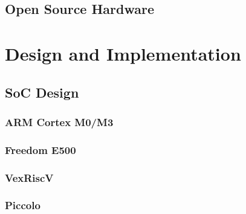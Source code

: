 \documentclass[a4paper,9pt]{report}
\begin{document}
\section{Open Source Hardware}

\section{}



\chapter{Design and Implementation}





%




\section{SoC Design}
\subsection{ARM Cortex M0/M3}
\subsection{Freedom E500}
\subsection{VexRiscV}
\subsection{Piccolo}
\end{document}
